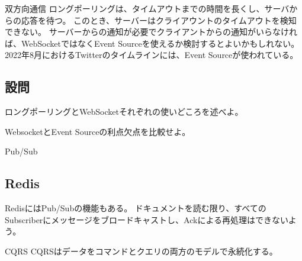 \documentclass{jlreq}
\begin{document}
\begin{section-bib}{双方向通信}
  ロングポーリングは、タイムアウトまでの時間を長くし、サーバからの応答を待つ。
  このとき、サーバーはクライアウントのタイムアウトを検知できない\cite{sdi}。
  サーバーからの通知が必要でクライアントからの通知がいらなければ、WebSocketではなくEvent Sourceを使えるか検討するとよいかもしれない。
  2022年8月におけるTwitterのタイムラインには、Event Sourceが使われている。
  \subsection{設問}
  \begin{exercise}
  \item ロングポーリングとWebSocketそれぞれの使いどころを述べよ。
  \item WebsocketとEvent Sourceの利点欠点を比較せよ。
  \end{exercise}
\end{section-bib}
\begin{section-bib}{Pub/Sub}
  \subsection{Redis}
  RedisにはPub/Subの機能もある\cite{redis-pubsub}。
  ドキュメントを読む限り、すべてのSubscriberにメッセージをブロードキャストし、Ackによる再処理はできないよう。
\end{section-bib}
\begin{section-bib}{CQRS}
  CQRSはデータをコマンドとクエリの両方のモデルで永続化する\cite{microsoft-cqrs}。
\end{section-bib}
\end{document}
